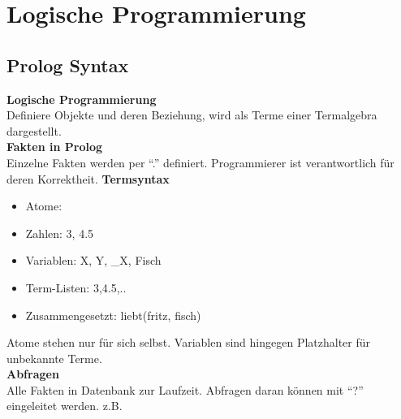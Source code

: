 

\section{Logische Programmierung}

\subsection{Prolog Syntax}
\textbf{Logische Programmierung}\\
Definiere Objekte und deren Beziehung, wird als Terme einer Termalgebra dargestellt.\\
\textbf{Fakten in Prolog}\\
Einzelne Fakten werden per \enquote{.} definiert.
Programmierer ist verantwortlich für deren Korrektheit.
\textbf{Termsyntax}
\begin{itemize}
  \item Atome: 
  \item Zahlen: 3, 4.5
  \item Variablen: X, Y, _X, Fisch
  \item Term-Listen: 3,4.5,..
  \item Zusammengesetzt: liebt(fritz, fisch)
\end{itemize}
Atome stehen nur für sich selbst. Variablen sind hingegen Platzhalter für unbekannte Terme.\\
\textbf{Abfragen}\\
Alle Fakten in Datenbank zur Laufzeit. Abfragen daran können mit \enquote{?} eingeleitet werden.
z.B. 

